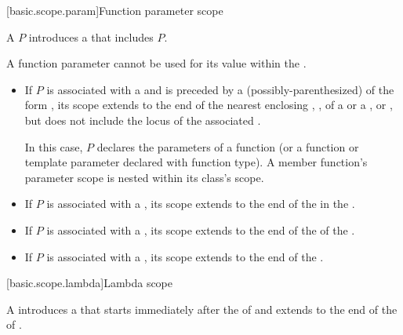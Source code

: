 [basic.scope.param]{Function parameter scope}

%
%

\pnum
A  $P$ introduces
a  that includes $P$.
\begin{note}
A function parameter cannot be used for its value
within the .
\end{note}
\begin{itemize}
\item
If $P$ is associated with a  and
is preceded by a (possibly-parenthesized)  of
the form
 ,
its scope extends to the end of the nearest enclosing
,
,
 of a  or
a , or
,
but does not include the locus of the associated .
\begin{note}
In this case, $P$ declares the parameters of a function
(or a function or template parameter declared with function type).
A member function's parameter scope is nested within its class's scope.
\end{note}
\item
If $P$ is associated with a ,
its scope extends to the end of the 
in the .
\item
If $P$ is associated with a ,
its scope extends to the end of the  of the .
\item
If $P$ is associated with a ,
its scope extends to the end of the .
\end{itemize}

[basic.scope.lambda]{Lambda scope}

A   introduces a 
that starts immediately after the  of 
and extends to the end of the  of .

